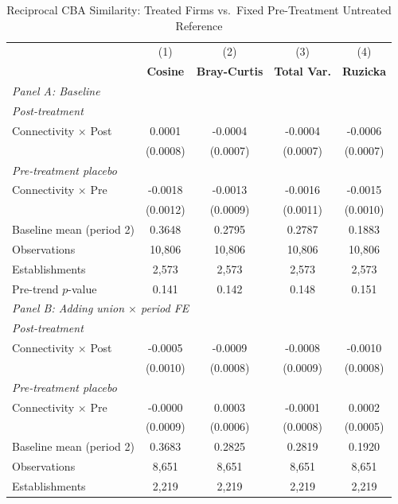 \begin{table}[H]
\centering
\caption{Reciprocal CBA Similarity: Treated Firms vs.\ Fixed Pre-Treatment Untreated Reference}
\label{tab:treated_pretreat_ref_uncorr_w_cba_similarity}
\scriptsize
\setlength{\tabcolsep}{8pt}
\begin{tabular}{lcccc}
\toprule\toprule
 & (1) & (2) & (3) & (4) \\
 & \textbf{Cosine} & \textbf{Bray-Curtis} & \textbf{Total Var.} & \textbf{Ruzicka} \\
\midrule
\multicolumn{5}{l}{\textit{Panel A: Baseline}} \\
\multicolumn{5}{l}{\textit{Post-treatment}} \\
Connectivity $\times$ Post & 0.0001 & -0.0004 & -0.0004 & -0.0006 \\
 & (0.0008) & (0.0007) & (0.0007) & (0.0007) \\
\multicolumn{5}{l}{\textit{Pre-treatment placebo}} \\
Connectivity $\times$ Pre & -0.0018 & -0.0013 & -0.0016 & -0.0015 \\
 & (0.0012) & (0.0009) & (0.0011) & (0.0010) \\
\midrule
Baseline mean (period 2) & 0.3648 & 0.2795 & 0.2787 & 0.1883 \\
Observations &       10,806 &       10,806 &       10,806 &       10,806 \\
Establishments &        2,573 &        2,573 &        2,573 &        2,573 \\
Pre-trend $p$-value & 0.141 & 0.142 & 0.148 & 0.151 \\
\midrule
\multicolumn{5}{l}{\textit{Panel B: Adding union $\times$ period FE}} \\
\multicolumn{5}{l}{\textit{Post-treatment}} \\
Connectivity $\times$ Post & -0.0005 & -0.0009 & -0.0008 & -0.0010 \\
 & (0.0010) & (0.0008) & (0.0009) & (0.0008) \\
\multicolumn{5}{l}{\textit{Pre-treatment placebo}} \\
Connectivity $\times$ Pre & -0.0000 & 0.0003 & -0.0001 & 0.0002 \\
 & (0.0009) & (0.0006) & (0.0008) & (0.0005) \\
\midrule
Baseline mean (period 2) & 0.3683 & 0.2825 & 0.2819 & 0.1920 \\
Observations &        8,651 &        8,651 &        8,651 &        8,651 \\
Establishments &        2,219 &        2,219 &        2,219 &        2,219 \\

\end{tabular}
\end{table}
